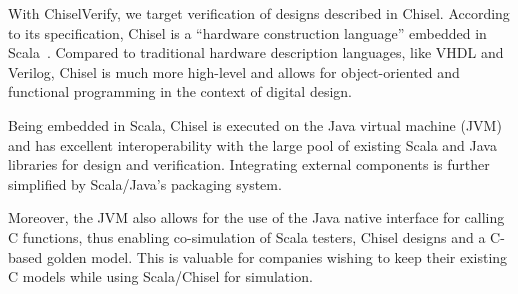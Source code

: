 \documentclass[conference]{IEEEtran}
\begin{document}
With ChiselVerify, we target verification of designs described in Chisel. According to its 
specification, Chisel is a ``hardware construction language'' embedded in 
Scala~\cite{chisel:dac2012}. Compared to traditional hardware description languages, like 
VHDL and Verilog, Chisel is much more high-level and allows for object-oriented and functional 
programming in the context of digital design.


Being embedded in Scala, Chisel is executed on the Java virtual machine (JVM) and has excellent 
interoperability with the large pool of existing Scala and Java libraries for design and verification. 
Integrating external components is further simplified by Scala/Java's packaging system.


Moreover, the JVM also allows for the use of the Java native interface for calling C functions, 
thus enabling co-simulation of Scala testers, Chisel designs and a C-based golden model. This is 
valuable for companies wishing to keep their existing C models while using Scala/Chisel for simulation.

\end{document}

